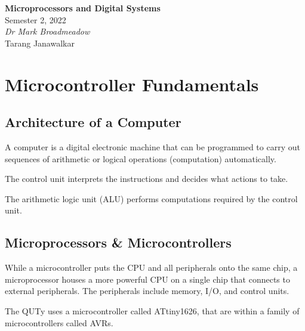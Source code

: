 \documentclass{article}
\date{}
\newcommand{\unitName}{Microprocessors and Digital Systems}
\newcommand{\unitTime}{Semester 2, 2022}
\newcommand{\unitCoordinator}{Dr Mark Broadmeadow}
\newcommand{\documentAuthors}{Tarang Janawalkar}
\begin{document}
%
\begin{titlepage}
    \vspace*{\fill}
    \begin{center}
        \LARGE{\textbf{\unitName}} \\[0.1in]
        \normalsize{\unitTime} \\[0.2in]
        \normalsize\textit{\unitCoordinator} \\[0.2in]
        \documentAuthors
    \end{center}
    \vspace*{\fill}
    \doclicenseThis
    \thispagestyle{empty}
\end{titlepage}
\newpage
%
\tableofcontents
\newpage
%
\section{Microcontroller Fundamentals}
\subsection{Architecture of a Computer}
\begin{definition}[Computer]
    A computer is a digital electronic machine that can be programmed to carry
    out sequences of arithmetic or logical operations (computation) automatically.
\end{definition}
\begin{definition}
    The control unit interprets the instructions and decides what actions to take.
\end{definition}
\begin{definition}
    The arithmetic logic unit (ALU) performs computations required by the control unit.
\end{definition}
\subsection{Microprocessors \& Microcontrollers}
While a microcontroller puts the CPU and all peripherals onto the same chip,
a microprocessor houses a more powerful CPU on a single chip that connects to external peripherals.
The peripherals include memory, I/O, and control units.

The QUTy uses a microcontroller called ATtiny1626, that are within a family of microcontrollers called AVRs.
\end{document}

